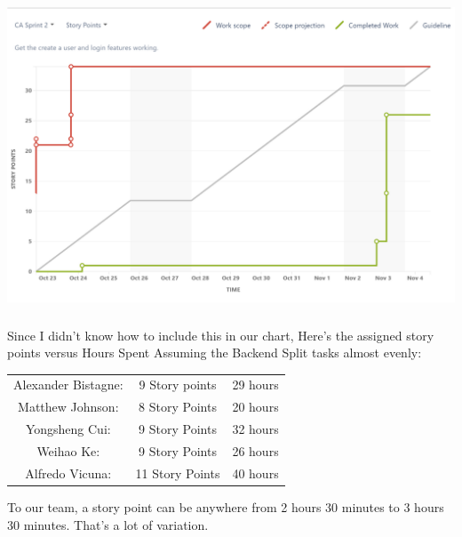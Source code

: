 \documentclass[2pt]{article}
\begin{document}
\begin{flushleft}
         \includegraphics[width=15cm, height=10cm]{JIRA_Burnup_Chart_2.png}
         \\
					Since I didn't know how to include this in our chart,
         Here's the assigned story points versus Hours Spent 
         Assuming the Backend Split tasks almost evenly:\\
         \begin{center}
         \begin{tabular}{c c c}
         Alexander Bistagne: & 9   Story points & 29 hours\\
         Matthew Johnson:   & 8   Story Points  & 20 hours\\
         Yongsheng Cui:	      & 9   Story Points & 32 hours\\
         Weihao Ke:             & 9   Story Points & 26 hours\\
         Alfredo Vicuna:        & 11 Story Points & 40 hours
					\end{tabular}
					\end{center}
					\item To our team, a story point can be anywhere from 2 hours 30 minutes to 3 hours 30 minutes. That's a lot of variation.
					
    \end{flushleft}
\end{document}

